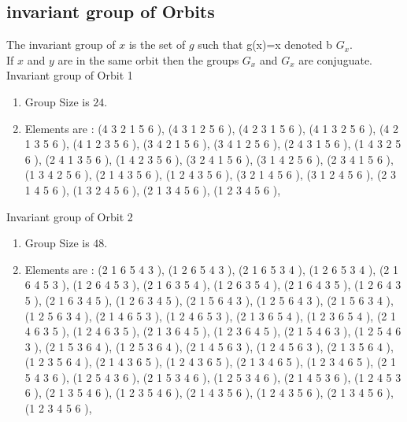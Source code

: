 \documentclass[12pt]{article}
\begin{document}
\subsection{invariant group of Orbits}
\noindent The invariant group of $x$ is the set of $g$ such that g(x)=x denoted b $G_x$.\\
If $x$ and $y$ are in the same orbit then the groups $G_x$ and  $G_x$ are conjuguate.\\
Invariant group of Orbit 1
\begin{enumerate}
\item Group Size is $24$.
\item Elements are : (4 3 2 1 5 6  ), (4 3 1 2 5 6  ), (4 2 3 1 5 6  ), (4 1 3 2 5 6  ), (4 2 1 3 5 6  ), (4 1 2 3 5 6  ), (3 4 2 1 5 6  ), (3 4 1 2 5 6  ), (2 4 3 1 5 6  ), (1 4 3 2 5 6  ), (2 4 1 3 5 6  ), (1 4 2 3 5 6  ), (3 2 4 1 5 6  ), (3 1 4 2 5 6  ), (2 3 4 1 5 6  ), (1 3 4 2 5 6  ), (2 1 4 3 5 6  ), (1 2 4 3 5 6  ), (3 2 1 4 5 6  ), (3 1 2 4 5 6  ), (2 3 1 4 5 6  ), (1 3 2 4 5 6  ), (2 1 3 4 5 6  ), (1 2 3 4 5 6  ), 
\end{enumerate}
Invariant group of Orbit 2
\begin{enumerate}
\item Group Size is $48$.
\item Elements are : (2 1 6 5 4 3  ), (1 2 6 5 4 3  ), (2 1 6 5 3 4  ), (1 2 6 5 3 4  ), (2 1 6 4 5 3  ), (1 2 6 4 5 3  ), (2 1 6 3 5 4  ), (1 2 6 3 5 4  ), (2 1 6 4 3 5  ), (1 2 6 4 3 5  ), (2 1 6 3 4 5  ), (1 2 6 3 4 5  ), (2 1 5 6 4 3  ), (1 2 5 6 4 3  ), (2 1 5 6 3 4  ), (1 2 5 6 3 4  ), (2 1 4 6 5 3  ), (1 2 4 6 5 3  ), (2 1 3 6 5 4  ), (1 2 3 6 5 4  ), (2 1 4 6 3 5  ), (1 2 4 6 3 5  ), (2 1 3 6 4 5  ), (1 2 3 6 4 5  ), (2 1 5 4 6 3  ), (1 2 5 4 6 3  ), (2 1 5 3 6 4  ), (1 2 5 3 6 4  ), (2 1 4 5 6 3  ), (1 2 4 5 6 3  ), (2 1 3 5 6 4  ), (1 2 3 5 6 4  ), (2 1 4 3 6 5  ), (1 2 4 3 6 5  ), (2 1 3 4 6 5  ), (1 2 3 4 6 5  ), (2 1 5 4 3 6  ), (1 2 5 4 3 6  ), (2 1 5 3 4 6  ), (1 2 5 3 4 6  ), (2 1 4 5 3 6  ), (1 2 4 5 3 6  ), (2 1 3 5 4 6  ), (1 2 3 5 4 6  ), (2 1 4 3 5 6  ), (1 2 4 3 5 6  ), (2 1 3 4 5 6  ), (1 2 3 4 5 6  ), 
\end{enumerate}
\end{document}
